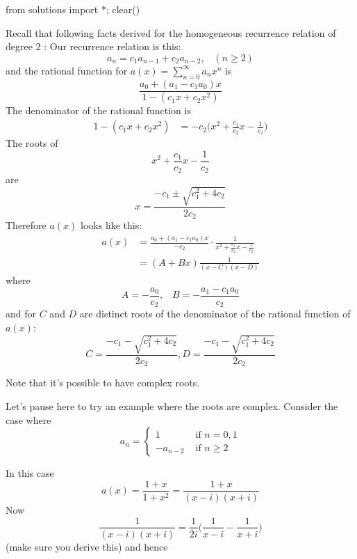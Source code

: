\begin{python0}
from solutions import *; clear() 
\end{python0}

Recall that following facts derived for the homogeneous recurrence
relation of degree 2
: Our recurrence relation is this:
\[
a_n = c_1 a_{n-1} + c_2 a_{n-2}, \,\,\,\,\, (n \geq 2)
\]
and the rational function for $a(x) = \sum_{n=0}^\infty a_n x^n$ is
\[
\frac
{a_0 + (a_1 - c_1 a_0) x}
{1 - (c_1 x + c_2 x^2)}
\]
The denominator of the rational function is
\begin{align*}
1 - (c_1 x + c_2 x^2)
&= -c_2 \biggl( x^2 + \frac{c_1}{c_2} x - \frac{1}{c_2} \biggr)
\end{align*}
The roots of
\[
x^2 + \frac{c_1}{c_2} x - \frac{1}{c_2}
\]
are
\[
x
=
\frac{-c_1 \pm \sqrt{c_1^2 + 4c_2}}{2c_2}
\]
Therefore $a(x)$ looks like this:
\begin{align*}
a(x) 
&=
\frac {a_0 + (a_1 - c_1 a_0) x} {-c_2} \cdot
\frac{1}{x^2 + \frac{c_1}{c_2} x - \frac{1}{c_2}} \\
&= (A + Bx) \frac{1}{(x-C)(x-D)}
\end{align*}
where
\[
A = -\frac{a_0}{c_2}, \,\,\,\,\, B = -\frac{a_1 - c_1 a_0}{c_2}
\] 
and for $C$ and $D$ are distinct roots of the
denominator of the rational function of $a(x)$:
\[
C = \frac{-c_1 - \sqrt{c_1^2 + 4c_2}}{2c_2},
D = \frac{-c_1 - \sqrt{c_1^2 + 4c_2}}{2c_2}
\]

Note that it's possible to have complex roots.

Let's pause here to try an example where the roots are complex.
Consider the case where
\[
a_n 
= 
\begin{cases}
1 & \text{ if } n = 0, 1 \\
-a_{n-2} & \text{ if } n \geq 2
\end{cases}
\]

In this case
\[
a(x) 
= \frac{1 + x}{1 + x^2} 
= \frac{1 + x}{(x - i)(x + i)}
\]
Now 
\[
\frac{1}{(x-i)(x+i)}
=
\frac{1}{2i} 
\biggl(
\frac{1}{x - i}
-
\frac{1}{x + i}
\biggr)
\]
(make sure you derive this) and hence

